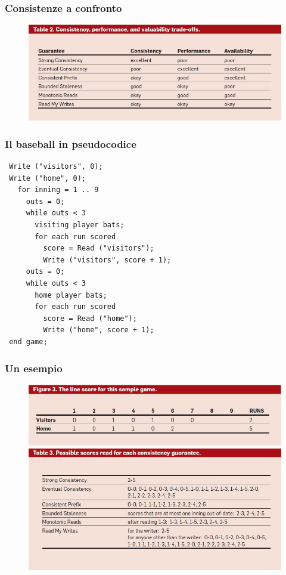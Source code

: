 \begin{frame}
\frametitle{Consistenze a confronto}
	\begin{figure}
		\includegraphics[scale=0.5]{baseball/tab2.jpg}
	\end{figure}
\end{frame}

\begin{frame}[fragile]
\frametitle{Il baseball in pseudocodice}
\begin{verbatim}
 Write ("visitors", 0);
 Write ("home", 0);
   for inning = 1 .. 9
     outs = 0;
     while outs < 3
       visiting player bats;
       for each run scored
         score = Read ("visitors");
         Write ("visitors", score + 1);
     outs = 0;
     while outs < 3
       home player bats;
       for each run scored
         score = Read ("home");
         Write ("home", score + 1);
 end game;
\end{verbatim}
\end{frame}

\begin{frame}
\frametitle{Un esempio}
	\begin{figure}
		\includegraphics[scale=0.4]{baseball/tab3a.jpg}\\
		\includegraphics[scale=0.4]{baseball/tab3.jpg}
	\end{figure}
\end{frame}
